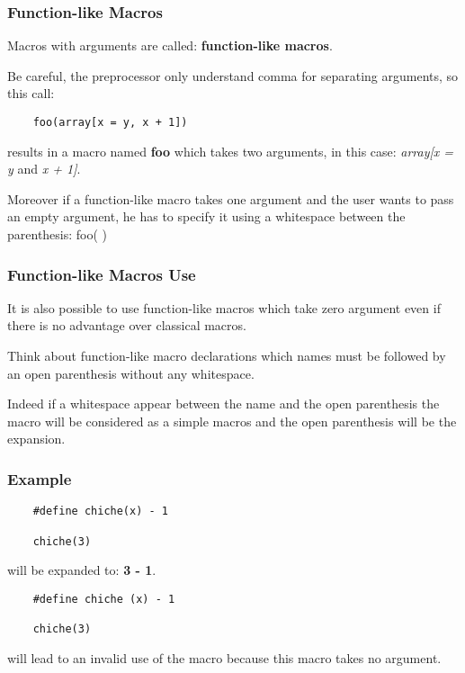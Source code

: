 \documentclass[9pt]{beamer}
\newcommand{\nl}[0]{\vspace{0.4cm}}
\begin{document}

\begin{frame}[containsverbatim]
  \frametitle{Function-like Macros}

  Macros with arguments are called: \textbf{function-like macros}.

  \nl

  Be careful, the preprocessor only understand comma for separating arguments,
  so this call:

  \begin{verbatim}
    foo(array[x = y, x + 1])
  \end{verbatim}

  results in a macro named \textbf{foo} which takes two arguments,
  in this case: \textit{array[x = y} and \textit{x + 1]}.

  Moreover if a function-like macro takes one argument and the user
  wants to pass an empty argument, he has to specify it using a
  whitespace between the parenthesis: foo( )
\end{frame}


\begin{frame}
  \frametitle{Function-like Macros Use}

  It is also possible to use function-like macros which take zero argument
  even if there is no advantage over classical macros.

  \nl

  Think about function-like macro declarations which names \alert{must} be
  followed by an open parenthesis without any whitespace.

  \nl

  Indeed if a whitespace appear between the name and the open parenthesis
  the macro will be considered as a simple macros and the open parenthesis
  will be the expansion.

\end{frame}


\begin{frame}[containsverbatim]
  \frametitle{Example}

  \begin{verbatim}
    #define chiche(x) - 1

    chiche(3)
  \end{verbatim}

  will be expanded to: \textbf{3 - 1}.

  \begin{verbatim}
    #define chiche (x) - 1

    chiche(3)
  \end{verbatim}

  will lead to an invalid use of the macro because this macro takes no
  argument.
\end{frame}
\end{document}

